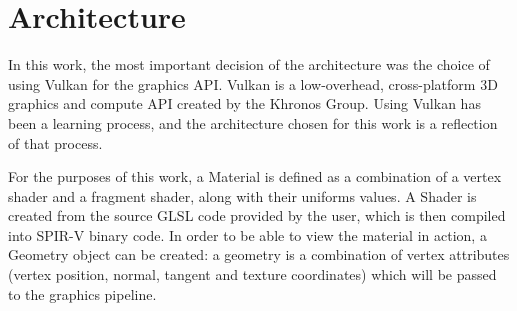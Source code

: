 \section{Architecture}
In this work, the most important decision of the architecture was the choice of using Vulkan for the graphics API. Vulkan is a low-overhead, cross-platform 3D graphics and compute API created by the Khronos Group. Using Vulkan has been a learning process, and the architecture chosen for this work is a reflection of that process.

For the purposes of this work, a Material is defined as a combination of a vertex shader and a fragment shader, along with their uniforms values. A Shader is created from the source GLSL code provided by the user, which is then compiled into SPIR-V binary code. In order to be able to view the material in action, a Geometry object can be created: a geometry is a combination of vertex attributes (vertex position, normal, tangent and texture coordinates) which will be passed to the graphics pipeline.












